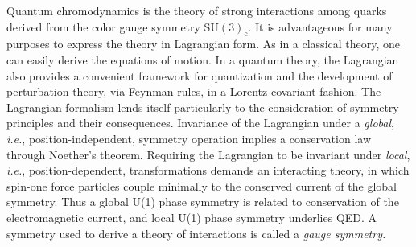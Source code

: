 \documentclass[prb,groupedaddress,nofootinbib,showpacs,twocolumn,floatfix]{revtex4}
\newcommand{\ie}{{\em i.e.}}
\newcommand{\cgg}{\ensuremath{\mathrm{SU(3)}_{\mathrm{c}}}}
\begin{document}
Quantum chromodynamics is the theory of strong interactions among
quarks derived from the color gauge symmetry \cgg. 
It is advantageous for many purposes to express the theory in 
Lagrangian form.
As in a classical theory, one can easily derive the equations of motion.
In a quantum theory, the Lagrangian also provides a convenient 
framework for quantization and the development of perturbation theory, 
via Feynman rules, in a Lorentz-covariant fashion.
The Lagrangian formalism lends itself particularly to the consideration
of symmetry principles and their consequences.
Invariance of the Lagrangian under a \emph{global}, \ie,
position-independent, symmetry operation implies a conservation law
through Noether's theorem.
Requiring the Lagrangian to be invariant under \emph{local}, \ie,
position-dependent, transformations demands an interacting theory, in
which spin-one force particles couple minimally to the conserved current
of the global symmetry.
Thus a global U(1) phase symmetry is related to conservation of the
electromagnetic current, and local U(1) phase symmetry underlies QED.
A symmetry used to derive a theory of interactions is called a
\emph{gauge symmetry.}
\end{document}
